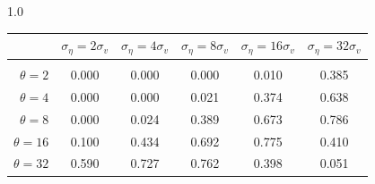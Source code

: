 \documentclass[12pt]{article}
\begin{document}
\begin{table}[h!]
\begin{subtable}{1.0\textwidth}
    \centering
\begin{tabular}{rccccc}
\hline  
            & \multicolumn{1}{l}{$\sigma_{\eta} =2\sigma_{v}$} & \multicolumn{1}{l}{$\sigma_{\eta} =4\sigma_{v}$} & \multicolumn{1}{l}{$\sigma_{\eta} =8\sigma_{v}$} & \multicolumn{1}{l}{$\sigma_{\eta} =16\sigma_{v}$} & \multicolumn{1}{l}{$\sigma_{\eta} =32\sigma_{v}$} \\ \hline  \vspace{-3mm} \\        
$\theta=2$  & 0.000                                             & 0.000                                             & 0.000                                             & 0.010                                              & 0.385                                              \\ \hline
$\theta=4$  & 0.000                                             & 0.000                                             & 0.021                                             & 0.374                                              & 0.638                                              \\ \hline
$\theta=8$  & 0.000                                             & 0.024                                             & 0.389                                             & 0.673                                              & 0.786                                              \\ \hline
$\theta=16$ & 0.100                                             & 0.434                                             & 0.692                                             & 0.775                                              & 0.410                                              \\ \hline
$\theta=32$ & 0.590                                             & 0.727                                             & 0.762                                             & 0.398                                              & 0.051                                              \\ \hline
\end{tabular}
\end{subtable}


\end{table}
\end{document}
